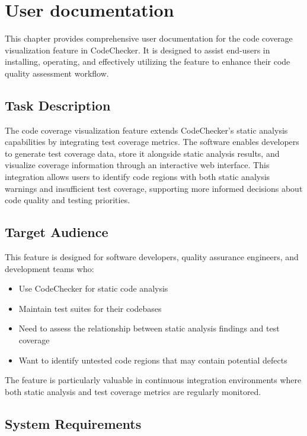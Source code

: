 \chapter{User documentation}
\label{ch:user}

This chapter provides comprehensive user documentation for the code coverage visualization feature in CodeChecker. It is designed to assist end-users in installing, operating, and effectively utilizing the feature to enhance their code quality assessment workflow.

\section{Task Description}

The code coverage visualization feature extends CodeChecker's static analysis capabilities by integrating test coverage metrics. The software enables developers to generate test coverage data, store it alongside static analysis results, and visualize coverage information through an interactive web interface. This integration allows users to identify code regions with both static analysis warnings and insufficient test coverage, supporting more informed decisions about code quality and testing priorities.

\section{Target Audience}

This feature is designed for software developers, quality assurance engineers, and development teams who:
\begin{itemize}
    \item Use CodeChecker for static code analysis
    \item Maintain test suites for their codebases
    \item Need to assess the relationship between static analysis findings and test coverage
    \item Want to identify untested code regions that may contain potential defects
\end{itemize}

The feature is particularly valuable in continuous integration environments where both static analysis and test coverage metrics are regularly monitored.

\section{System Requirements}

